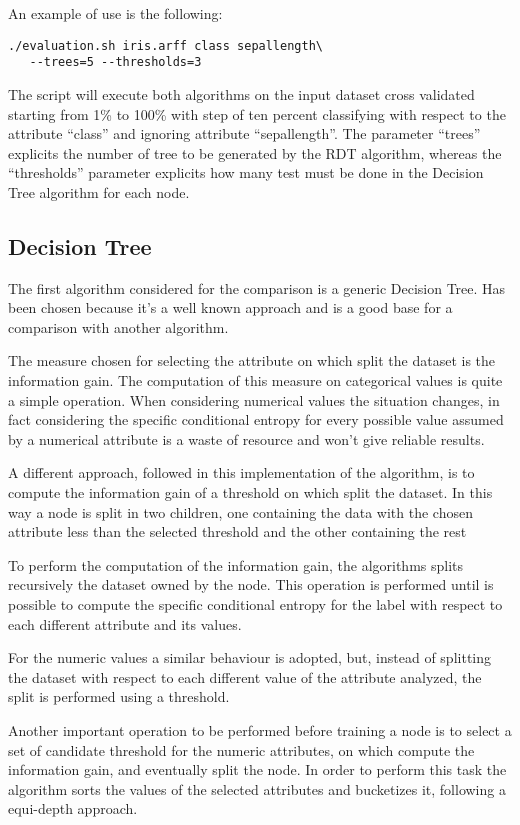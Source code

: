 \documentclass{acm_proc_article-sp-sigmod07}
\begin{document}
An example of use is the following:
\begin{verbatim}
./evaluation.sh iris.arff class sepallength\
   --trees=5 --thresholds=3
\end{verbatim}

The script will execute both algorithms on the input dataset cross
validated starting from 1\% to 100\% with step of ten percent classifying
with respect to the attribute ``class'' and ignoring attribute
``sepallength''. The parameter ``trees'' explicits the number of tree to be
generated by the RDT algorithm, whereas the ``thresholds'' parameter
explicits how many test must be done in the Decision Tree algorithm for
each node.

\subsection{Decision Tree}
The first algorithm considered for the comparison is a generic Decision
Tree. Has been chosen because it's a well known approach and is a good
base for a comparison with another algorithm.

The measure chosen for selecting the attribute on which split the dataset
is the information gain.
The computation of this measure on categorical values is quite a simple
operation. When considering numerical values the situation changes, in
fact considering the specific conditional entropy for every possible value
assumed by a numerical attribute is a waste of resource and won't give
reliable results.

A different approach, followed in this implementation of the algorithm, is
to compute the information gain of a threshold on which split the dataset.
In this way a node is split in two children, one containing the data with
the chosen attribute less than the selected threshold and the other
containing the rest 

To perform the computation of the information gain, the algorithms splits
recursively the dataset owned by the node. 
This operation is performed until is possible to compute the specific
conditional entropy for the label with respect to each different attribute
and its values.

For the numeric values a similar behaviour is adopted, but, instead of
splitting the dataset with respect to each different value of the
attribute analyzed, the split is performed using a threshold.

Another important operation to be performed before training a node is to
select a set of candidate threshold for the numeric attributes, on which
compute the information gain, and eventually split the node.
In order to perform this task the algorithm sorts the values of the
selected attributes and bucketizes it, following a equi-depth approach.
\end{document}
